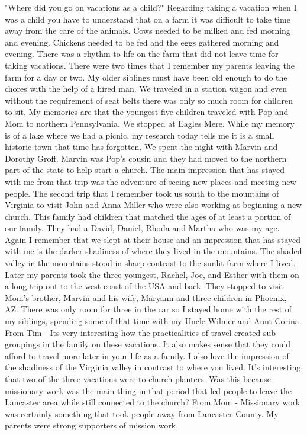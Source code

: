 "Where did you go on vacations as a child?"
Regarding taking a vacation when I was a child you have to understand that on a farm it was difficult to take time away from the care of the animals. Cows needed to be milked and fed morning and evening. Chickens needed to be fed and the eggs gathered morning and evening. There was a rhythm to life on the farm that did not leave time for taking vacations. There were two times that I remember my parents leaving the farm for a day or two. My older siblings must have been old enough to do the chores with the help of a hired man. We traveled in a station wagon and even without the requirement of seat belts there was only so much room for children to sit.
My memories are that the youngest five children traveled with Pop and Mom to northern Pennsylvania. We stopped at Eagles Mere. While my memory is of a lake where we had a picnic, my research today tells me it is a small historic town that time has forgotten. We spent the night with Marvin and Dorothy Groff. Marvin was Pop's cousin and they had moved to the northern part of the state to help start a church. The main impression that has stayed with me from that trip was the adventure of seeing new places and meeting new people.
The second trip that I remember took us south to the mountains of Virginia to visit John and Anna Miller who were also working at beginning a new church. This family had children that matched the ages of at least a portion of our family. They had a David, Daniel, Rhoda and Martha who was my age. Again I remember that we slept at their house and an impression that has stayed with me is the darker shadiness of where they lived in the mountains. The shaded valley in the mountains stood in sharp contrast to the sunlit farm where I lived.
Later my parents took the three youngest, Rachel, Joe, and Esther with them on a long trip out to the west coast of the USA and back. They stopped to visit Mom's brother, Marvin and his wife, Maryann and three children in Phoenix, AZ. There was only room for three in the car so I stayed home with the rest of my siblings, spending some of that time with my Uncle Wilmer and Aunt Corina.
From Tim - Its very interesting how the practicalities of travel created sub-groupings in the family on these vacations. It also makes sense that they could afford to travel more later in your life as a family.
I also love the impression of the shadiness of the Virginia valley in contrast to where you lived.
It's interesting that two of the three vacations were to church planters. Was this because missionary work was the main thing in that period that led people to leave the Lancaster area while still connected to the church?
From Mom - Missionary work was certainly something that took people away from Lancaster County. My parents were strong supporters of mission work.





